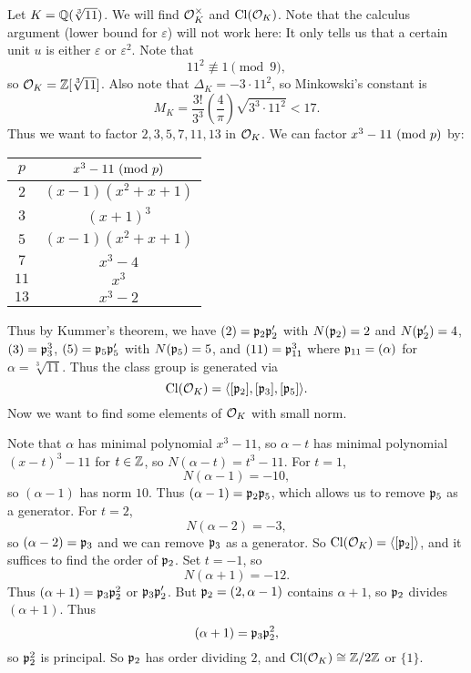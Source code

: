 \begin{example}
  Let $K = \mathbb{Q}(\sqrt[3]{11})$. We will find
  $\mathcal{O}_K^\times$ and $\operatorname{Cl}(\mathcal{O}_K)$. Note that the
  calculus argument (lower bound for $\varepsilon$)
  will not work here: It only tells us that a certain
  unit $u$ is either $\varepsilon$ or $\varepsilon^2$.
  Note that
  \[11^2 \not\equiv 1 \pmod{9},\]
  so $\mathcal{O}_K = \mathbb{Z}[\sqrt[3]{11}]$. Also note that
  $\Delta_K = -3 \cdot 11^2$, so Minkowski's constant is
  \[
    M_K = \frac{3!}{3^3} \left(\frac{4}{\pi}\right) \sqrt{3^3 \cdot 11^2}
    < 17.
  \]
  Thus we want to factor $2, 3, 5, 7, 11, 13$ in
  $\mathcal{O}_K$. We can factor $x^3 - 11 \ (\mathrm{mod}\ p)$ by:
  \begin{center}
    \begin{tabular}{c|c}
      $p$ & $x^3 - 11 \ (\mathrm{mod}\ p)$ \\
      \hline
      $2$ & $(x - 1)(x^2 + x + 1)$ \\
      $3$ & $(x + 1)^3$ \\
      $5$ & $(x - 1)(x^2 + x + 1)$ \\
      $7$ & $x^3 - 4$ \\
      $11$ & $x^3$ \\
      $13$ & $x^3 - 2$
    \end{tabular}
  \end{center}
  Thus by Kummer's theorem, we have
  $(2) = \mathfrak{p}_2 \mathfrak{p}_2'$ with $N(\mathfrak{p}_2) = 2$
  and $N(\mathfrak{p}_2') = 4$, $(3) = \mathfrak{p}_3^3$,
  $(5) = \mathfrak{p}_5 \mathfrak{p}_5'$ with $N(\mathfrak{p}_5) = 5$, and
  $(11) = \mathfrak{p}_{11}^3$ where $\mathfrak{p}_{11} = (\alpha)$
  for $\alpha = \sqrt[3]{11}$.
  Thus the class group is generated via
  \[
    \operatorname{Cl}(\mathcal{O}_K) = \langle [\mathfrak{p}_2], [\mathfrak{p}_3], [\mathfrak{p}_5] \rangle.
  \]
  Now we want to find some elements of $\mathcal{O}_K$ with
  small norm.

  Note that $\alpha$ has minimal polynomial
  $x^3 - 11$, so $\alpha - t$ has minimal polynomial
  $(x - t)^3 - 11$
  for $t \in \mathbb{Z}$, so $N(\alpha - t) = t^3 - 11$.
  For $t = 1$,
  \[
    N(\alpha - 1) = -10,
  \]
  so $(\alpha - 1)$ has norm $10$. Thus
  $(\alpha - 1) = \mathfrak{p}_2 \mathfrak{p}_5$, which allows us to remove
  $\mathfrak{p}_5$ as a generator. For $t = 2$,
  \[
    N(\alpha - 2) = -3,
  \]
  so $(\alpha - 2) = \mathfrak{p}_3$ and we can remove
  $\mathfrak{p}_3$ as a generator. So
  $\operatorname{Cl}(\mathcal{O}_K) = \langle [\mathfrak{p}_2] \rangle$, and it suffices
  to find the order of $\mathfrak{p}_2$. Set $t = -1$, so
  \[
    N(\alpha + 1) = -12.
  \]
  Thus $(\alpha + 1) = \mathfrak{p}_3 \mathfrak{p}_2^2$ or
  $\mathfrak{p}_3 \mathfrak{p}_2'$. But $\mathfrak{p}_2 = (2, \alpha - 1)$
  contains $\alpha + 1$, so $\mathfrak{p}_2$ divides
  $(\alpha + 1)$. Thus
  \[
    (\alpha + 1) = \mathfrak{p}_3 \mathfrak{p}_2^2,
  \]
  so $\mathfrak{p}_2^2$ is principal. So $\mathfrak{p}_2$ has order
  dividing $2$, and $\operatorname{Cl}(\mathcal{O}_K) \cong \mathbb{Z} / 2\mathbb{Z}$
  or $\{1\}$.


\end{example}
